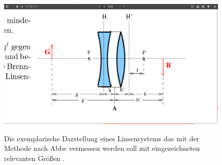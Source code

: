 \begin{figure}
	\centering
	\caption{Die exemplarische Darstellung eines Linsensystems das mit der Methode nach Abbe vermessen werden soll mit eingezeichneten relevanten Größen \cite{V408}.}
	\includegraphics[width=\linewidth-150pt,height=\textheight-150pt,keepaspectratio]{content/images/7.png}
	\label{7}
\end{figure}
